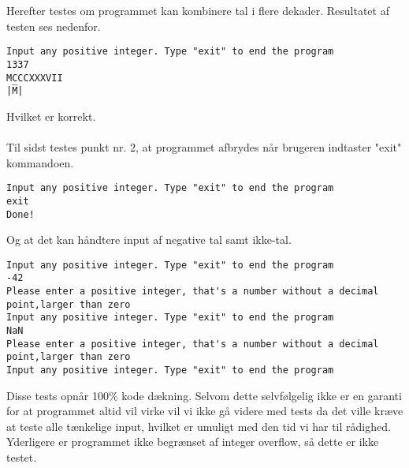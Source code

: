 	Herefter testes om programmet kan kombinere tal i flere dekader. Resultatet af testen ses nedenfor.
	\begin{lstlisting}[caption=Test af dekadekombination]
Input any positive integer. Type "exit" to end the program
1337
MCCCXXXVII
|M̅|
	\end{lstlisting}
	Hvilket er korrekt. \\
	\\
	Til sidst testes punkt nr. 2, at programmet afbrydes når brugeren indtaster "exit" kommandoen.
	\begin{lstlisting}[caption=Test af exit kommando]
Input any positive integer. Type "exit" to end the program
exit
Done!
	\end{lstlisting}
	Og at det kan håndtere input af negative tal samt ikke-tal.
	\begin{lstlisting}[caption=Test af dårligt input]
Input any positive integer. Type "exit" to end the program
-42
Please enter a positive integer, that's a number without a decimal point,larger than zero
Input any positive integer. Type "exit" to end the program
NaN
Please enter a positive integer, that's a number without a decimal point,larger than zero
Input any positive integer. Type "exit" to end the program
	\end{lstlisting}
	
	Disse tests opnår 100\% kode dækning. Selvom dette selvfølgelig ikke er en garanti for at programmet altid vil virke vil vi ikke gå videre med tests da det ville kræve at teste alle tænkelige input, hvilket er umuligt med den tid vi har til rådighed. Yderligere er programmet ikke begrænset af integer overflow, så dette er ikke testet.
